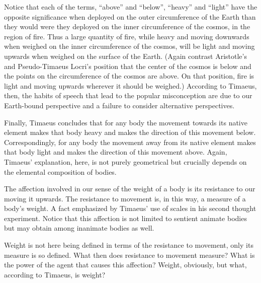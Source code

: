 Notice that each of the terms, ``above'' and ``below'', ``heavy'' and ``light'' have the opposite significance when deployed on the outer circumference of the Earth than they would were they deployed on the inner circumference of the cosmos, in the region of fire. Thus a large quantity of fire, while heavy and moving downwards when weighed on the inner circumference of the cosmos, will be light and moving upwards when weighed on the surface of the Earth. (Again contrast Aristotle's and Pseudo-Timaeus Locri's position that the center of the cosmos is below and the points on the circumference of the cosmos are above. On that position, fire is light and moving upwards wherever it should be weighed.) According to Timaeus, then, the habits of speech that lead to the popular misconception are due to our Earth-bound perspective and a failure to consider alternative perspectives.

Finally, Timaeus concludes that for any body the movement towards its native element makes that body heavy and makes the direction of this movement below. Correspondingly, for any body the movement away from its native element makes that body light and makes the direction of this movement above. Again, Timaeus' explanation, here, is not purely geometrical but crucially depends on the elemental composition of bodies.

The affection involved in our sense of the weight of a body is its resistance to our moving it upwards. The resistance to movement is, in this way, a measure of a body's weight. A fact emphasized by Timaeus' use of scales in his second thought experiment. Notice that this affection is not limited to sentient animate bodies but may obtain among inanimate bodies as well.

Weight is not here being defined in terms of the resistance to movement, only its measure is so defined. What then does resistance to movement measure? What is the power of the agent that causes this affection? Weight, obviously, but what, according to Timaeus, is weight?

